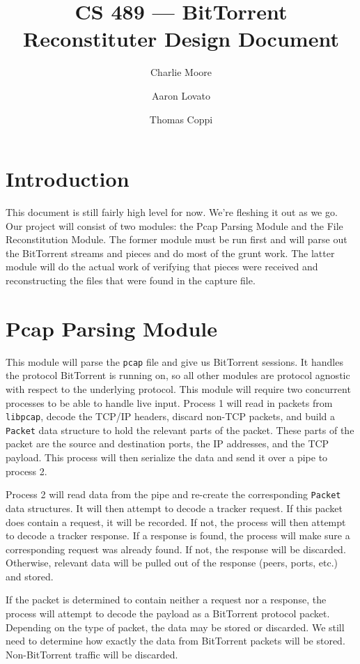\documentclass[11pt,titlepage]{article}
\author{Charlie Moore \and Aaron Lovato \and Thomas Coppi}
\title{CS 489 --- BitTorrent Reconstituter Design Document}
\begin{document}
\maketitle

\section{Introduction}
This document is still fairly high level for now.  We're fleshing it out as we
go.  Our project will consist of two modules: the Pcap Parsing Module and the
File Reconstitution Module.  The former module must be run first and will parse
out the BitTorrent streams and pieces and do most of the grunt work.  The latter
module will do the actual work of verifying that pieces were received and
reconstructing the files that were found in the capture file.

\section{Pcap Parsing Module}
This module will parse the \texttt{pcap} file and give us BitTorrent
sessions.  It handles the protocol BitTorrent is running on, so all other
modules are protocol agnostic with respect to the underlying protocol. This
module will require two concurrent processes to be able to handle live input.
Process 1 will read in packets from \texttt{libpcap}, decode the TCP/IP headers,
discard non-TCP packets, and build a \texttt{Packet} data structure to hold the
relevant parts of the packet. These parts of the packet are the source and
destination ports, the IP addresses, and the TCP payload. This process will then
serialize the data and send it over a pipe to process 2.

Process 2 will read data from the pipe and re-create the corresponding
\texttt{Packet} data structures. It will then attempt to decode a tracker
request. If this packet does contain a request, it will be recorded. If not, the
process will then attempt to decode a tracker response. If a response is found,
the process will make sure a corresponding request was already found. If not,
the response will be discarded. Otherwise, relevant data will be pulled out of
the response (peers, ports, etc.) and stored.

If the packet is determined to contain neither a request nor a response, the
process will attempt to decode the payload as a BitTorrent protocol packet. 
Depending on the type of packet, the data may be stored or discarded. We still 
need to determine how exactly the data from BitTorrent packets will be stored.
Non-BitTorrent traffic will be discarded.
\end{document}
